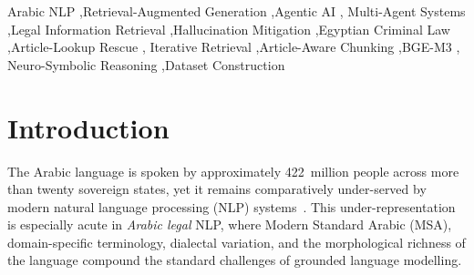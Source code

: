 \documentclass[final,1p,times]{elsarticle}
\begin{document}
\begin{frontmatter}
\begin{abstract}
path on any agent failure. The system is deployed as a production FastAPI service
with a five-provider, multi-key failover chain, big-context routing, a zero-token
answer cache, an in-process rate gate, a wall-clock cascade budget, persistent
multi-turn sessions with compaction, token streaming, automated watch-folder
ingestion with hot-reload, and a documented .NET integration contract. Finally, we report a retrieval-quality optimisation
phase targeting the retrieval ceiling that bounds answer correctness---article-aware
chunking that keeps each statute article intact in one retrievable unit (live), a
widened cross-encoder candidate pool (live), and a BGE-M3 embedding upgrade
prepared behind configuration---together with a scored evaluation harness reporting
recall@k, article-recall, primary-hit@k, MRR, hallucination rate, abstention, and
confidence calibration over a labeled gold set, so every change is measurable. We
also report a practical systems finding: on CPU-only hardware the highest-quality
embedder can be infeasible to \emph{build} without accelerator access, making the
embedder a joint quality/operability choice. We release the corpus, the system,
the multi-version evaluation trail, and the evaluation harness.
\end{abstract}

\begin{keyword}
Arabic NLP \sep Retrieval-Augmented Generation \sep Agentic AI \sep
Multi-Agent Systems \sep Legal Information Retrieval \sep Hallucination
Mitigation \sep Egyptian Criminal Law \sep Article-Lookup Rescue \sep
Iterative Retrieval \sep Article-Aware Chunking \sep BGE-M3 \sep
Neuro-Symbolic Reasoning \sep Dataset Construction
\end{keyword}

\end{frontmatter}

\section{Introduction}\label{sec:intro}

The Arabic language is spoken by approximately 422~million people across more
than twenty sovereign states, yet it remains comparatively under-served by
modern natural language processing (NLP) systems~\cite{elbeltagy2024}. This
under-representation is especially acute in \emph{Arabic legal} NLP, where
Modern Standard Arabic (MSA), domain-specific terminology, dialectal
variation, and the morphological richness of the language compound the
standard challenges of grounded language modelling.
\end{document}
